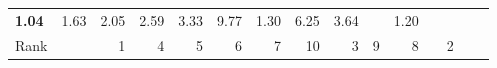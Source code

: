 \begin{tabular}{ll|rrrrrr|rrrrrrr}
  


  
  \textbf{1.04} & 1.63 & 2.05 & 2.59 & 3.33 & 9.77 & 1.30 & 6.25 & 3.64 &  & 1.20 \\

  Rank & &
  1 & 4 & 5 & 6 & 7 & 10 & 3 & 9 & 8 &  & 2 \\\hline\hline
  

\end{tabular}

